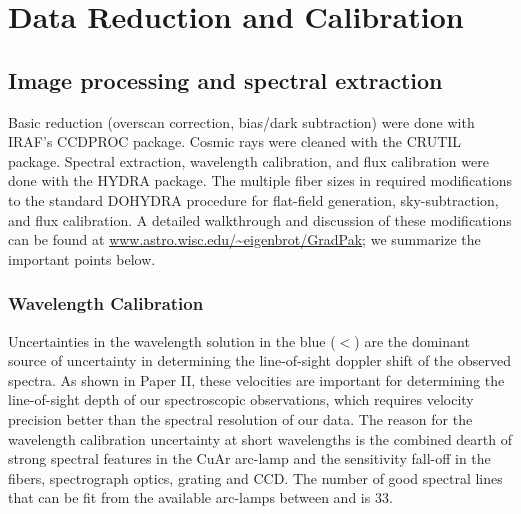 \section{Data Reduction and Calibration}
\label{sec:data_reduction}

\subsection{Image processing and spectral extraction}

Basic reduction (overscan correction, bias/dark subtraction) were done
with IRAF's CCDPROC package. Cosmic rays were cleaned with the CRUTIL
package. Spectral extraction, wavelength calibration, and flux
calibration were done with the HYDRA package. The multiple fiber sizes
in \GP required modifications to the standard DOHYDRA procedure for
flat-field generation, sky-subtraction, and flux calibration. A
detailed walkthrough and discussion of these modifications can be
found at \url{www.astro.wisc.edu/~eigenbrot/GradPak}; we summarize the
important points below.

\subsubsection{Wavelength Calibration}
\label{sec:wavecal}

Uncertainties in the wavelength solution in the blue
($<$) are the dominant source of uncertainty in
determining the line-of-sight doppler shift of the observed
spectra. As shown in Paper II, these velocities are important for
determining the line-of-sight depth of our spectroscopic observations,
which requires velocity precision better than the spectral resolution
of our data.
The reason for the wavelength calibration uncertainty
at short wavelengths is the combined dearth of strong spectral
features in the CuAr arc-lamp and the sensitivity fall-off in the
fibers, spectrograph optics, grating and CCD. The number of good
spectral lines that can be fit from the available arc-lamps between
 and  is 33.

